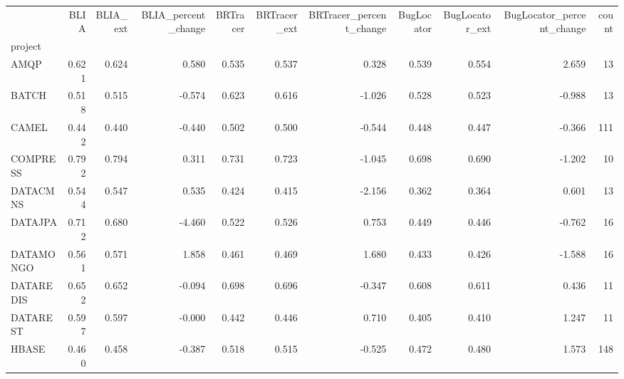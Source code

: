 \begin{tabular}{lrrrrrrrrrr}
\toprule
{} &  BLIA &  BLIA\_ext &  BLIA\_percent\_change &  BRTracer &  BRTracer\_ext &  BRTracer\_percent\_change &  BugLocator &  BugLocator\_ext &  BugLocator\_percent\_change &  count \\
project   &       &           &                      &           &               &                          &             &                 &                            &        \\
\midrule
AMQP      & 0.621 &     0.624 &                0.580 &     0.535 &         0.537 &                    0.328 &       0.539 &           0.554 &                      2.659 &     13 \\
BATCH     & 0.518 &     0.515 &               -0.574 &     0.623 &         0.616 &                   -1.026 &       0.528 &           0.523 &                     -0.988 &     13 \\
CAMEL     & 0.442 &     0.440 &               -0.440 &     0.502 &         0.500 &                   -0.544 &       0.448 &           0.447 &                     -0.366 &    111 \\
COMPRESS  & 0.792 &     0.794 &                0.311 &     0.731 &         0.723 &                   -1.045 &       0.698 &           0.690 &                     -1.202 &     10 \\
DATACMNS  & 0.544 &     0.547 &                0.535 &     0.424 &         0.415 &                   -2.156 &       0.362 &           0.364 &                      0.601 &     13 \\
DATAJPA   & 0.712 &     0.680 &               -4.460 &     0.522 &         0.526 &                    0.753 &       0.449 &           0.446 &                     -0.762 &     16 \\
DATAMONGO & 0.561 &     0.571 &                1.858 &     0.461 &         0.469 &                    1.680 &       0.433 &           0.426 &                     -1.588 &     16 \\
DATAREDIS & 0.652 &     0.652 &               -0.094 &     0.698 &         0.696 &                   -0.347 &       0.608 &           0.611 &                      0.436 &     11 \\
DATAREST  & 0.597 &     0.597 &               -0.000 &     0.442 &         0.446 &                    0.710 &       0.405 &           0.410 &                      1.247 &     11 \\
HBASE     & 0.460 &     0.458 &               -0.387 &     0.518 &         0.515 &                   -0.525 &       0.472 &           0.480 &                      1.573 &    148 \\

\end{tabular}
